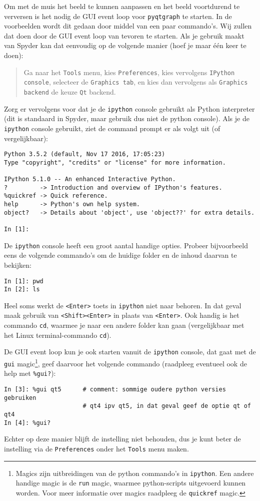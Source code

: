 \documentclass[a4paper,11pt]{article}
\begin{document}
Om met de muis het beeld te kunnen aanpassen en het beeld voortdurend te
verversen is het nodig de GUI event loop voor \texttt{pyqtgraph} te starten.
In de voorbeelden wordt dit gedaan door middel van een paar commando's. Wij
zullen dat doen door de GUI event loop van tevoren te starten. Als je gebruik
maakt van Spyder kan dat eenvoudig op de volgende manier (hoef je maar \'e\'en
keer te doen):
\begin{quote}
  Ga naar het \texttt{Tools} menu, kies \texttt{Preferences}, kies vervolgens
  \texttt{IPython console}, selecteer de \texttt{Graphics tab}, en kies dan
  vervolgens als \texttt{Graphics backend} de keuze \texttt{Qt} backend.
\end{quote}
Zorg er vervolgens voor dat je de \texttt{ipython} console gebruikt als Python
interpreter (dit is standaard in Spyder, maar gebruik dus niet de python
console). Als je de \texttt{ipython} console gebruikt, ziet de command prompt
er als volgt uit (of vergelijkbaar):
\begin{verbatim}
Python 3.5.2 (default, Nov 17 2016, 17:05:23) 
Type "copyright", "credits" or "license" for more information.

IPython 5.1.0 -- An enhanced Interactive Python.
?         -> Introduction and overview of IPython's features.
%quickref -> Quick reference.
help      -> Python's own help system.
object?   -> Details about 'object', use 'object??' for extra details.

In [1]: 
\end{verbatim}
De \texttt{ipython} console heeft een groot aantal handige opties. Probeer bijvoorbeeld eens de volgende commando's om de huidige folder en de inhoud daarvan te bekijken:
\begin{verbatim}
In [1]: pwd
In [2]: ls
\end{verbatim}
Heel soms werkt de \texttt{<Enter>} toets in \texttt{ipython} niet naar behoren. In dat geval maak gebruik van \texttt{<Shift><Enter>} in plaats van \texttt{<Enter>}. 
Ook handig is het commando \texttt{cd}, waarmee  je  naar een andere folder kan gaan (vergelijkbaar met het Linux terminal-commando \texttt{cd}).

De GUI event loop kun je ook starten vanuit de \texttt{ipython} console, dat gaat met de \texttt{gui} magic\footnote{Magics zijn uitbreidingen van de python commando's in \texttt{ipython}. Een andere handige magic is de \texttt{run} magic, waarmee python-scripts uitgevoerd kunnen worden. Voor meer informatie over magics raadpleeg de \texttt{quickref} magic.}, geef daarvoor het volgende commando (raadpleeg eventueel ook de help met \texttt{\%gui?}):
\begin{verbatim}
In [3]: %gui qt5      # comment: sommige oudere python versies gebruiken
                      # qt4 ipv qt5, in dat geval geef de optie qt of qt4
In [4]: %gui?
\end{verbatim}
Echter op deze manier blijft de instelling niet behouden, dus je kunt beter de instelling via de \texttt{Preferences} onder het \texttt{Tools} menu maken.
\end{document}
